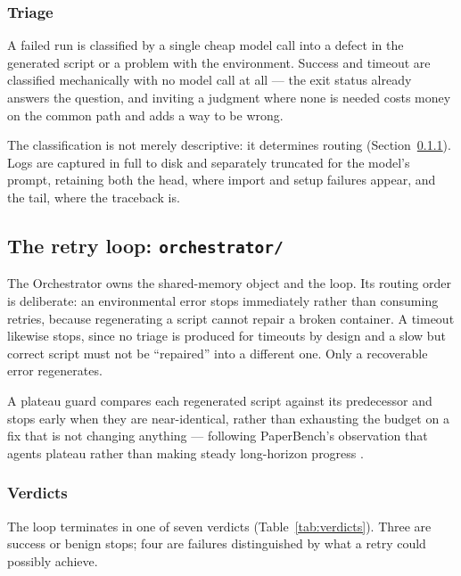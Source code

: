 \documentclass[10pt,twocolumn]{article}
\begin{document}
\subsubsection{Triage}

A failed run is classified by a single cheap model call into a defect in the generated
script or a problem with the environment. Success and timeout are classified mechanically
with no model call at all --- the exit status already answers the question, and inviting a
judgment where none is needed costs money on the common path and adds a way to be wrong.

The classification is not merely descriptive: it determines routing
(Section~\ref{sec:orchestrator}). Logs are captured in full to disk and separately
truncated for the model's prompt, retaining both the head, where import and setup failures
appear, and the tail, where the traceback is.

\subsection{The retry loop: \texttt{orchestrator/}}

The Orchestrator owns the shared-memory object and the loop. Its routing order is
deliberate: an environmental error stops immediately rather than consuming retries,
because regenerating a script cannot repair a broken container. A timeout likewise stops,
since no triage is produced for timeouts by design and a slow but correct script must not
be ``repaired'' into a different one. Only a recoverable error regenerates.

A plateau guard compares each regenerated script against its predecessor and stops early
when they are near-identical, rather than exhausting the budget on a fix that is not
changing anything --- following PaperBench's observation that agents plateau rather than
making steady long-horizon progress \cite{starace2025paperbench}.


\subsubsection{Verdicts}
\label{sec:orchestrator}

The loop terminates in one of seven verdicts (Table~\ref{tab:verdicts}). Three are
success or benign stops; four are failures distinguished by what a retry could possibly
achieve.
\end{document}
